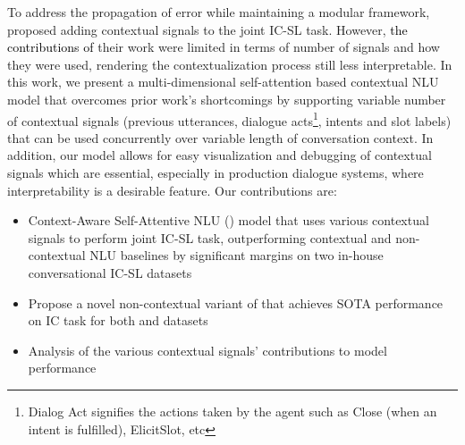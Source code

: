 To address %
the propagation of error while maintaining a modular 
framework, \citet{Shi2015ContextualSL} %
proposed adding contextual signals to the joint IC-SL task. However, \textcolor{black}{the contributions of }their work were limited in terms of number of signals and how they were used, rendering the contextualization process still less interpretable. In this work, we present a multi-dimensional self-attention based contextual NLU model that overcomes prior work's shortcomings by supporting variable number of contextual signals (previous utterances, dialogue acts\footnote{Dialog Act signifies the actions taken by the agent such as Close (when an intent is fulfilled), ElicitSlot, etc}, intents and slot labels) that can be used concurrently over variable length of conversation context.
In addition, our model allows for easy visualization and debugging of contextual signals which are essential, especially in production dialogue systems, where interpretability is a desirable feature. Our contributions are:
\begin{itemize}[noitemsep,topsep=0pt,parsep=0pt,partopsep=0pt]
\item Context-Aware Self-Attentive NLU () model that uses various contextual signals to perform joint IC-SL task, outperforming contextual and non-contextual NLU baselines by significant margins on two in-house conversational IC-SL datasets
\item Propose a novel non-contextual variant of  that achieves SOTA performance on IC task for both  and  datasets
\item Analysis of the various contextual signals' contributions to model performance
\end{itemize}



